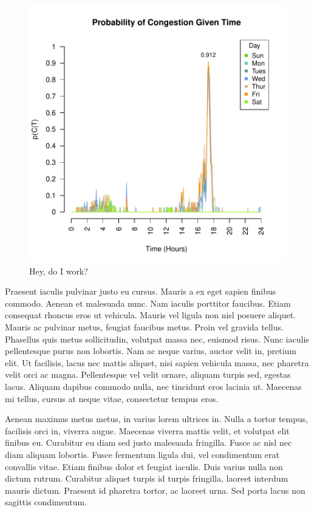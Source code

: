 \documentclass{report}
\begin{document}
\begin{figure}[h]
\centering
\includegraphics{upstat_report-bayesplot}
\caption{ Hey, do I work?}
\label{fig:bayesplot}
\end{figure}

Praesent iaculis pulvinar justo eu cursus. Mauris a ex eget sapien finibus commodo. Aenean et malesuada nunc. Nam iaculis porttitor faucibus. Etiam consequat rhoncus eros ut vehicula. Mauris vel ligula non nisl posuere aliquet. Mauris ac pulvinar metus, feugiat faucibus metus. Proin vel gravida tellus. Phasellus quis metus sollicitudin, volutpat massa nec, euismod risus. Nunc iaculis pellentesque purus non lobortis. Nam ac neque varius, auctor velit in, pretium elit. Ut facilisis, lacus nec mattis aliquet, nisi sapien vehicula massa, nec pharetra velit orci ac magna. Pellentesque vel velit ornare, aliquam turpis sed, egestas lacus. Aliquam dapibus commodo nulla, nec tincidunt eros lacinia ut. Maecenas mi tellus, cursus at neque vitae, consectetur tempus eros.

Aenean maximus metus metus, in varius lorem ultrices in. Nulla a tortor tempus, facilisis orci in, viverra augue. Maecenas viverra mattis velit, et volutpat elit finibus eu. Curabitur eu diam sed justo malesuada fringilla. Fusce ac nisl nec diam aliquam lobortis. Fusce fermentum ligula dui, vel condimentum erat convallis vitae. Etiam finibus dolor et feugiat iaculis. Duis varius nulla non dictum rutrum. Curabitur aliquet turpis id turpis fringilla, laoreet interdum mauris dictum. Praesent id pharetra tortor, ac laoreet urna. Sed porta lacus non sagittis condimentum.
\end{document}
